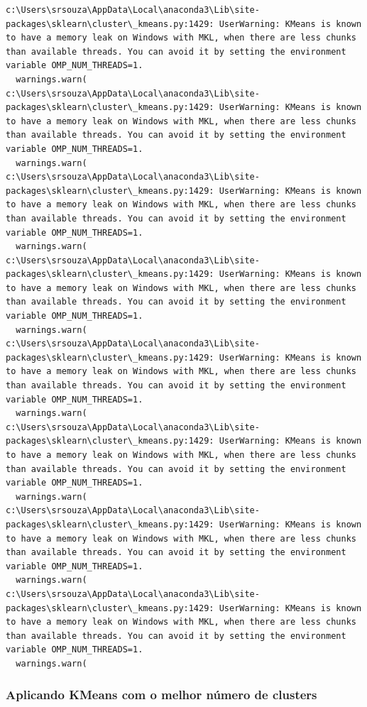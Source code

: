 \documentclass[
  letterpaper,
  DIV=11,
  numbers=noendperiod]{scrartcl}
\begin{document}
\begin{verbatim}
c:\Users\srsouza\AppData\Local\anaconda3\Lib\site-packages\sklearn\cluster\_kmeans.py:1429: UserWarning: KMeans is known to have a memory leak on Windows with MKL, when there are less chunks than available threads. You can avoid it by setting the environment variable OMP_NUM_THREADS=1.
  warnings.warn(
c:\Users\srsouza\AppData\Local\anaconda3\Lib\site-packages\sklearn\cluster\_kmeans.py:1429: UserWarning: KMeans is known to have a memory leak on Windows with MKL, when there are less chunks than available threads. You can avoid it by setting the environment variable OMP_NUM_THREADS=1.
  warnings.warn(
c:\Users\srsouza\AppData\Local\anaconda3\Lib\site-packages\sklearn\cluster\_kmeans.py:1429: UserWarning: KMeans is known to have a memory leak on Windows with MKL, when there are less chunks than available threads. You can avoid it by setting the environment variable OMP_NUM_THREADS=1.
  warnings.warn(
c:\Users\srsouza\AppData\Local\anaconda3\Lib\site-packages\sklearn\cluster\_kmeans.py:1429: UserWarning: KMeans is known to have a memory leak on Windows with MKL, when there are less chunks than available threads. You can avoid it by setting the environment variable OMP_NUM_THREADS=1.
  warnings.warn(
c:\Users\srsouza\AppData\Local\anaconda3\Lib\site-packages\sklearn\cluster\_kmeans.py:1429: UserWarning: KMeans is known to have a memory leak on Windows with MKL, when there are less chunks than available threads. You can avoid it by setting the environment variable OMP_NUM_THREADS=1.
  warnings.warn(
c:\Users\srsouza\AppData\Local\anaconda3\Lib\site-packages\sklearn\cluster\_kmeans.py:1429: UserWarning: KMeans is known to have a memory leak on Windows with MKL, when there are less chunks than available threads. You can avoid it by setting the environment variable OMP_NUM_THREADS=1.
  warnings.warn(
c:\Users\srsouza\AppData\Local\anaconda3\Lib\site-packages\sklearn\cluster\_kmeans.py:1429: UserWarning: KMeans is known to have a memory leak on Windows with MKL, when there are less chunks than available threads. You can avoid it by setting the environment variable OMP_NUM_THREADS=1.
  warnings.warn(
c:\Users\srsouza\AppData\Local\anaconda3\Lib\site-packages\sklearn\cluster\_kmeans.py:1429: UserWarning: KMeans is known to have a memory leak on Windows with MKL, when there are less chunks than available threads. You can avoid it by setting the environment variable OMP_NUM_THREADS=1.
  warnings.warn(
\end{verbatim}

\subsubsection{Aplicando KMeans com o melhor número de
clusters}\label{aplicando-kmeans-com-o-melhor-nuxfamero-de-clusters}
\end{document}
